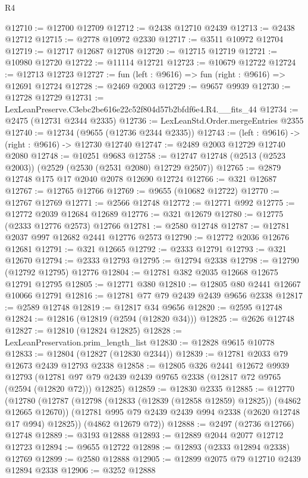 \begin{lexlean}{R4}
\begin{coremodule}
@12710 := @12700 @12709
@12712 := @2438 @12710 @2439
@12713 := @2438 @12712
@12715 := @2778 @10972 @2330
@12717 := @3511 @10972 @12704
@12719 := @12717 @12687 @12708
@12720 := @12715 @12719
@12721 := @10980 @12720
@12722 := @11114 @12721
@12723 := @10679 @12722
@12724 := @12713 @12723
@12727 := fun (left : @9616) => fun (right : @9616) => @12691 @12724
@12728 := @2469 @2003
@12729 := @9657 @9939
@12730 := @12728 @12729
@12731 := LexLeanPreserve.C3ebc2be616e22c52f804d57b2bfdf6e4.R4.__fits_44
@12734 := @2475 (@12731 @2344 @2335)
@12736 := LexLeanStd.Order.mergeEntries @2355
@12740 := @12734 (@9655 (@12736 @2344 @2335))
@12743 := (left : @9616) -> (right : @9616) -> @12730 @12740
@12747 := @2489 @2003 @12729 @12740 @2080
@12748 := @10251 @9683
@12758 := @12747 @12748 (@2513 (@2523 @2003)) (@2529 (@2530 (@2531 @2080) @12729 @2507))
@12765 := @2879 @12748 @175 @17 @2040 @2078 @12690 @12724
@12766 := @321 @12687
@12767 := @12765 @12766
@12769 := @9655 (@10682 @12722)
@12770 := @12767 @12769
@12771 := @2566 @12748
@12772 := @12771 @992
@12775 := @12772 @2039 @12684 @12689
@12776 := @321 @12679
@12780 := @12775 (@2333 @12776 @2573) @12766
@12781 := @2580 @12748
@12787 := @12781 @2037 @997 @12682 @2441 @12776 @2573
@12790 := @12772 @2036 @12676 @12681
@12791 := @321 @12665
@12792 := @2333 @12791
@12793 := @321 @12670
@12794 := @2333 @12793
@12795 := @12794 @2338
@12798 := @12790 (@12792 @12795) @12776
@12804 := @12781 @382 @2035 @12668 @12675 @12791 @12795
@12805 := @12771 @380
@12810 := @12805 @80 @2441 @12667 @10066 @12791
@12816 := @12781 @77 @79 @2439 @2439 @9656 @2338
@12817 := @2589 @12748
@12819 := @12817 @34 @9656
@12820 := @2595 @12748
@12824 := @12816 (@12819 (@2594 (@12820 @34)))
@12825 := @2626 @12748
@12827 := @12810 (@12824 @12825)
@12828 := LexLeanPreservation.prim_length_list
@12830 := @12828 @9615 @10778
@12833 := @12804 (@12827 (@12830 @2344))
@12839 := @12781 @2033 @79 @12673 @2439 @12793 @2338
@12858 := @12805
    @326
    @2441
    @12672
    @9939
    @12793
    (@12781 @97 @79 @2439 @2439 @9765 @2338 (@12817 @72 @9765 (@2594 (@12820 @72))) @12825)
@12859 := @12830 @2335
@12885 := @12770
    (@12780
      (@12787
        (@12798 (@12833 (@12839 (@12858 @12859) @12825)) (@4862 @12665 @12670))
        (@12781 @995 @79 @2439 @2439 @994 @2338 (@2620 @12748 @17 @994) @12825))
      (@4862 @12679 @72))
@12888 := @2497 (@2736 @12766) @12748
@12889 := @3193 @12888
@12893 := @12889 @2044 @2077 @12712 @12723
@12894 := @9655 @12722
@12898 := @12893 (@2333 @12894 @2338) @12769
@12899 := @2580 @12888
@12905 := @12899 @2075 @79 @12710 @2439 @12894 @2338
@12906 := @3252 @12888

\end{coremodule}
\end{lexlean}
